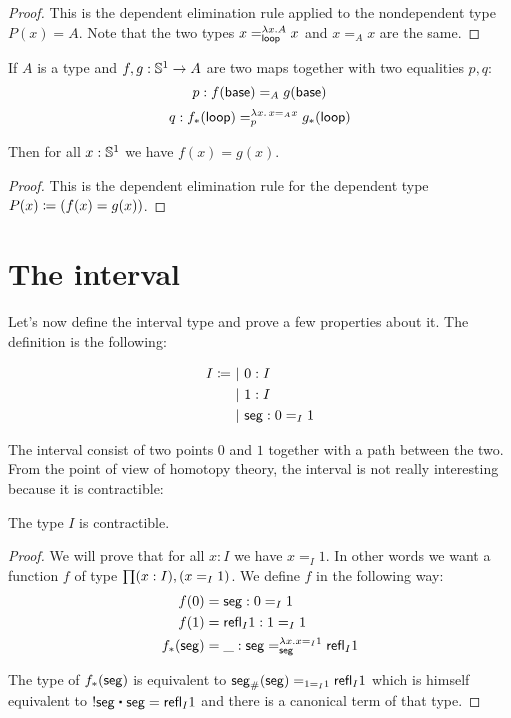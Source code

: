\begin{proof}
  This is the dependent elimination rule applied to the nondependent type
  $P(x)=A$. Note that the two types $x=^{\lambda{}x.A}_\lloop{}x$ and $x=_Ax$
  are the same.
\end{proof}

\begin{lem}
  If $A$ is a type and $f,g:\Sn^1\to{}A$ are two maps together with two
  equalities $p,q$:
  \[p:f(\base)=_Ag(\base)\]
  \[q:\map{f}\lloop=^{\lambda{}x.\,x=_Ax}_p\map{g}\lloop\]

  Then for all $x:\Sn^1$ we have $f(x)=g(x)$.
\end{lem}

\begin{proof}
  This is the dependent elimination rule for the dependent type
  $P(x)\defeq(f(x)=g(x))$.
\end{proof}

\section{The interval}

Let’s now define the interval type and prove a few properties about it. The
definition is the following:

\begin{align*}
  I \defeq&\ |\ 0:I\\
  &\ |\ 1:I \\
  &\ |\ \seg:\id[I]01
\end{align*}

The interval consist of two points $0$ and $1$ together with a path between the
two. From the point of view of homotopy theory, the interval is not really
interesting because it is contractible:

\begin{lem}
  The type $I$ is contractible.
\end{lem}

\begin{proof}
  We will prove that for all $x:I$ we have $x=_I1$. In other words we want a
  function $f$ of type $\prd{x:I}(x=_I1)$. We define $f$ in the following way:
  \begin{align*}
    f(0)&=\seg:0=_I1\\
    f(1)&=\refl{I}1:1=_I1\\
    \map{f}\seg&=\_:\seg=_\seg^{\lambda{}x.x=_I1}\refl{I}1
  \end{align*}

  The type of $\map{f}\seg$ is equivalent to $\trans\seg\seg=_{1=_I1}\refl{I}1$
  which is himself equivalent to $\rev\seg\ct\seg=\refl{I}1$ and there is a
  canonical term of that type.
\end{proof}

